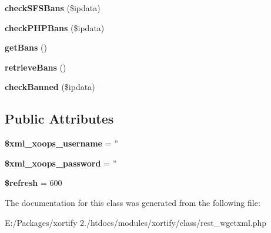 \begin{DoxyCompactItemize}
\item 
\hypertarget{class_r_e_s_t___w_g_e_t_x_m_l_xortify_exchange_a70aa59a6d0697e84ad810d8796dd5738}{{\bfseries check\-S\-F\-S\-Bans} (\$ipdata)}\label{class_r_e_s_t___w_g_e_t_x_m_l_xortify_exchange_a70aa59a6d0697e84ad810d8796dd5738}

\item 
\hypertarget{class_r_e_s_t___w_g_e_t_x_m_l_xortify_exchange_a6cef20c8fb8c786eff8e767f2745ab2c}{{\bfseries check\-P\-H\-P\-Bans} (\$ipdata)}\label{class_r_e_s_t___w_g_e_t_x_m_l_xortify_exchange_a6cef20c8fb8c786eff8e767f2745ab2c}

\item 
\hypertarget{class_r_e_s_t___w_g_e_t_x_m_l_xortify_exchange_ad2090b04c1f139acdad6432a27eacd89}{{\bfseries get\-Bans} ()}\label{class_r_e_s_t___w_g_e_t_x_m_l_xortify_exchange_ad2090b04c1f139acdad6432a27eacd89}

\item 
\hypertarget{class_r_e_s_t___w_g_e_t_x_m_l_xortify_exchange_a29300e17be5f4f11e6770150cf1f5cb4}{{\bfseries retrieve\-Bans} ()}\label{class_r_e_s_t___w_g_e_t_x_m_l_xortify_exchange_a29300e17be5f4f11e6770150cf1f5cb4}

\item 
\hypertarget{class_r_e_s_t___w_g_e_t_x_m_l_xortify_exchange_a71690d23be9b9ad29a9bc171c2409c83}{{\bfseries check\-Banned} (\$ipdata)}\label{class_r_e_s_t___w_g_e_t_x_m_l_xortify_exchange_a71690d23be9b9ad29a9bc171c2409c83}

\end{DoxyCompactItemize}
\subsection*{Public Attributes}
\begin{DoxyCompactItemize}
\item 
\hypertarget{class_r_e_s_t___w_g_e_t_x_m_l_xortify_exchange_a520ca0642f3fbb0e482bef99d2afacec}{{\bfseries \$xml\-\_\-xoops\-\_\-username} = ''}\label{class_r_e_s_t___w_g_e_t_x_m_l_xortify_exchange_a520ca0642f3fbb0e482bef99d2afacec}

\item 
\hypertarget{class_r_e_s_t___w_g_e_t_x_m_l_xortify_exchange_a04719119c49e2aecb1524d37d68cfb14}{{\bfseries \$xml\-\_\-xoops\-\_\-password} = ''}\label{class_r_e_s_t___w_g_e_t_x_m_l_xortify_exchange_a04719119c49e2aecb1524d37d68cfb14}

\item 
\hypertarget{class_r_e_s_t___w_g_e_t_x_m_l_xortify_exchange_a30dc955d0cbc62bde92a20b0835bdfb5}{{\bfseries \$refresh} = 600}\label{class_r_e_s_t___w_g_e_t_x_m_l_xortify_exchange_a30dc955d0cbc62bde92a20b0835bdfb5}

\end{DoxyCompactItemize}


The documentation for this class was generated from the following file\-:\begin{DoxyCompactItemize}
\item 
E\-:/\-Packages/xortify 2./htdocs/modules/xortify/class/rest\-\_\-wgetxml.\-php\end{DoxyCompactItemize}
